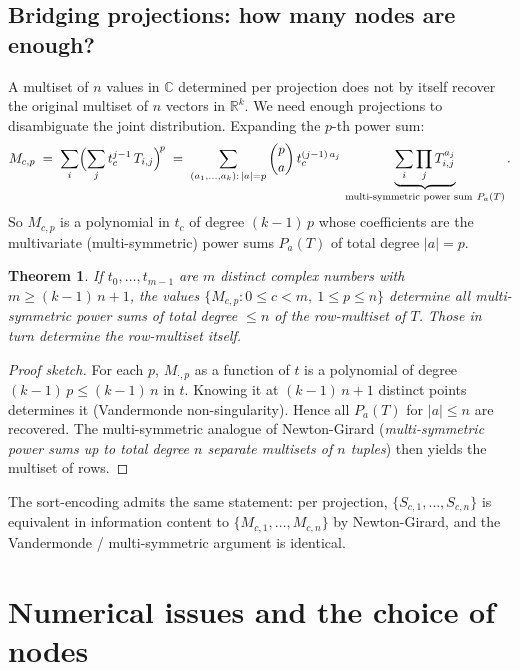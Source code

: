 \documentclass[a4paper,11pt]{article}
\newtheorem{theorem}{Theorem}
\begin{document}
\subsection{Bridging projections: how many nodes are enough?}

A multiset of $n$ values in $\mathbb{C}$ determined per projection
does not by itself recover the original multiset of $n$ vectors in
$\mathbb{R}^k$.  We need enough projections to disambiguate the joint
distribution.  Expanding the $p$-th power sum:
\[
  M_{c, p} \;=\; \sum_i \Bigl(\sum_j t_c^{j-1}\, T_{i, j}\Bigr)^{\!p}
  \;=\; \sum_{(a_1, \ldots, a_k):\,|a|=p}
        \binom{p}{a}\, t_c^{(j-1)\,a_j}\,
        \underbrace{\sum_i \prod_j T_{i, j}^{a_j}}_{\text{multi-symmetric
        power sum}\ P_{a}(T)}.
\]
So $M_{c, p}$ is a polynomial in $t_c$ of degree $(k-1)\,p$ whose
coefficients are the multivariate (multi-symmetric) power sums
$P_a(T)$ of total degree $|a| = p$.

\begin{theorem}
If $t_0, \ldots, t_{m-1}$ are $m$ distinct complex numbers with
$m \ge (k - 1)\,n + 1$, the values $\{M_{c, p} : 0 \le c < m,\
1 \le p \le n\}$ determine all multi-symmetric power sums of total
degree $\le n$ of the row-multiset of $T$.  Those in turn determine
the row-multiset itself.
\label{thm:bridging}
\end{theorem}

\begin{proof}[Proof sketch]
For each $p$, $M_{\cdot, p}$ as a function of $t$ is a polynomial of
degree $(k-1)\, p \le (k-1)\,n$ in $t$.  Knowing it at $(k-1)\,n + 1$
distinct points determines it (Vandermonde non-singularity).  Hence
all $P_a(T)$ for $|a| \le n$ are recovered.  The multi-symmetric
analogue of Newton-Girard (\emph{multi-symmetric power sums up to
total degree $n$ separate multisets of $n$ tuples}) then yields the
multiset of rows.
\end{proof}

The sort-encoding admits the same statement: per projection,
$\{S_{c, 1}, \ldots, S_{c, n}\}$ is equivalent in information content
to $\{M_{c, 1}, \ldots, M_{c, n}\}$ by Newton-Girard, and the
Vandermonde / multi-symmetric argument is identical.

\section{Numerical issues and the choice of nodes}
\end{document}
